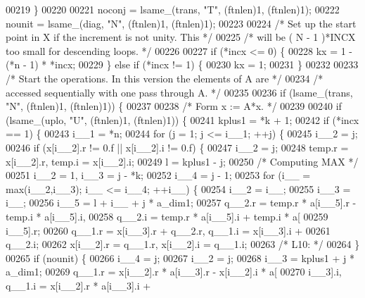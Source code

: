 \begin{DoxyCode}
00219     \}
00220 
00221     noconj = lsame\_(trans, \textcolor{stringliteral}{"T"}, (ftnlen)1, (ftnlen)1);
00222     nounit = lsame\_(diag, \textcolor{stringliteral}{"N"}, (ftnlen)1, (ftnlen)1);
00223 
00224 \textcolor{comment}{/*     Set up the start point in X if the increment is not unity. This */}
00225 \textcolor{comment}{/*     will be  ( N - 1 )*INCX   too small for descending loops. */}
00226 
00227     \textcolor{keywordflow}{if} (*incx <= 0) \{
00228     kx = 1 - (*n - 1) * *incx;
00229     \} \textcolor{keywordflow}{else} \textcolor{keywordflow}{if} (*incx != 1) \{
00230     kx = 1;
00231     \}
00232 
00233 \textcolor{comment}{/*     Start the operations. In this version the elements of A are */}
00234 \textcolor{comment}{/*     accessed sequentially with one pass through A. */}
00235 
00236     \textcolor{keywordflow}{if} (lsame\_(trans, \textcolor{stringliteral}{"N"}, (ftnlen)1, (ftnlen)1)) \{
00237 
00238 \textcolor{comment}{/*         Form  x := A*x. */}
00239 
00240     \textcolor{keywordflow}{if} (lsame\_(uplo, \textcolor{stringliteral}{"U"}, (ftnlen)1, (ftnlen)1)) \{
00241         kplus1 = *k + 1;
00242         \textcolor{keywordflow}{if} (*incx == 1) \{
00243         i\_\_1 = *n;
00244         \textcolor{keywordflow}{for} (j = 1; j <= i\_\_1; ++j) \{
00245             i\_\_2 = j;
00246             \textcolor{keywordflow}{if} (x[i\_\_2].r != 0.f || x[i\_\_2].i != 0.f) \{
00247             i\_\_2 = j;
00248             temp.r = x[i\_\_2].r, temp.i = x[i\_\_2].i;
00249             l = kplus1 - j;
00250 \textcolor{comment}{/* Computing MAX */}
00251             i\_\_2 = 1, i\_\_3 = j - *k;
00252             i\_\_4 = j - 1;
00253             \textcolor{keywordflow}{for} (i\_\_ = max(i\_\_2,i\_\_3); i\_\_ <= i\_\_4; ++i\_\_) \{
00254                 i\_\_2 = i\_\_;
00255                 i\_\_3 = i\_\_;
00256                 i\_\_5 = l + i\_\_ + j * a\_dim1;
00257                 q\_\_2.r = temp.r * a[i\_\_5].r - temp.i * a[i\_\_5].i, 
00258                     q\_\_2.i = temp.r * a[i\_\_5].i + temp.i * a[
00259                     i\_\_5].r;
00260                 q\_\_1.r = x[i\_\_3].r + q\_\_2.r, q\_\_1.i = x[i\_\_3].i + 
00261                     q\_\_2.i;
00262                 x[i\_\_2].r = q\_\_1.r, x[i\_\_2].i = q\_\_1.i;
00263 \textcolor{comment}{/* L10: */}
00264             \}
00265             \textcolor{keywordflow}{if} (nounit) \{
00266                 i\_\_4 = j;
00267                 i\_\_2 = j;
00268                 i\_\_3 = kplus1 + j * a\_dim1;
00269                 q\_\_1.r = x[i\_\_2].r * a[i\_\_3].r - x[i\_\_2].i * a[
00270                     i\_\_3].i, q\_\_1.i = x[i\_\_2].r * a[i\_\_3].i + 

\end{DoxyCode}
